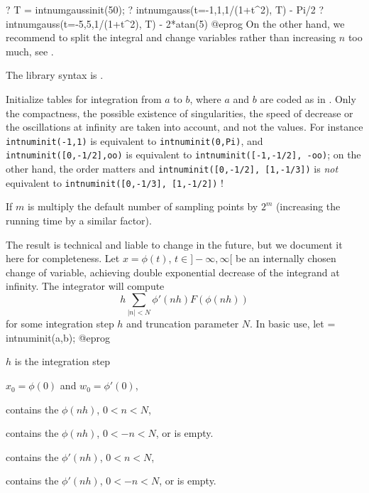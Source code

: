 ? T = intnumgaussinit(50);
? intnumgauss(t=-1,1,1/(1+t^2), T) - Pi/2
? intnumgauss(t=-5,5,1/(1+t^2), T) - 2*atan(5)
@eprog
On the other hand, we recommend to split the integral and change variables
rather than increasing $n$ too much, see .

The library syntax is .

\label{se:intnuminit}
Initialize tables for integration from
$a$ to $b$, where $a$ and $b$ are coded as in . Only the
compactness, the possible existence of singularities, the speed of decrease
or the oscillations at infinity are taken into account, and not the values.
For instance {\tt intnuminit(-1,1)} is equivalent to {\tt intnuminit(0,Pi)},
and {\tt intnuminit([0,-1/2],oo)} is equivalent to
{\tt intnuminit([-1,-1/2], -oo)}; on the other hand, the order matters
and
{\tt intnuminit([0,-1/2], [1,-1/3])} is \emph{not} equivalent to
{\tt intnuminit([0,-1/3], [1,-1/2])} !

If $m$ is multiply the default number of sampling points by $2^m$ (increasing
the running time by a similar factor).

The result is technical and liable to change in the future, but we document
it here for completeness. Let $x=\phi(t)$, $t\in ]-\infty,\infty[$ be an
internally chosen change of variable, achieving double exponential decrease of
the integrand at infinity. The integrator  will compute
$$ h \sum_{|n| < N} \phi'(nh) F(\phi(nh)) $$
for some integration step $h$ and truncation parameter $N$.
In basic use, let
\bprog
[h, x0, w0, xp, wp, xm, wm] = intnuminit(a,b);
@eprog

\item $h$ is the integration step

\item $x_0 = \phi(0)$  and $w_0 = \phi'(0)$,

\item {} contains the $\phi(nh)$, $0 < n < N$,

\item {} contains the $\phi(nh)$, $0 < -n < N$, or is empty.

\item {} contains the $\phi'(nh)$, $0 < n < N$,

\item {} contains the $\phi'(nh)$, $0 < -n < N$, or is empty.

